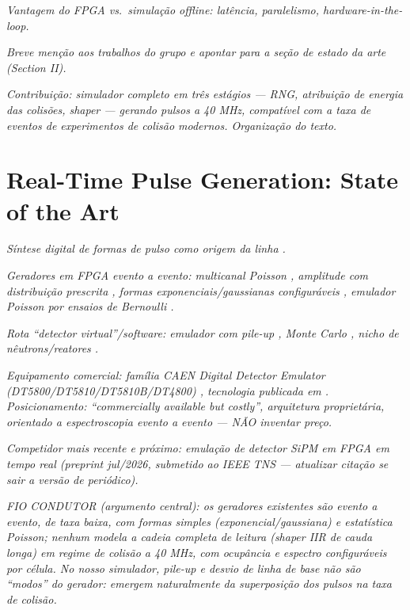\documentclass[journal]{IEEEtran}
\newcommand{\todo}[1]{\textcolor{red!70!black}{\textit{#1}}}
\begin{document}
\todo{Vantagem do FPGA vs.\ simulação offline: latência, paralelismo, hardware-in-the-loop.}

\todo{Breve menção aos trabalhos do grupo \cite{quirino2025,paschoalin2026} e apontar para a seção de estado da arte (Section II).}

\todo{Contribuição: simulador completo em três estágios — RNG, atribuição de energia das colisões, shaper — gerando pulsos a 40 MHz, compatível com a taxa de eventos de experimentos de colisão modernos. Organização do texto.}

\section{Real-Time Pulse Generation: State of the Art}

\todo{Síntese digital de formas de pulso como origem da linha \cite{jordanov1994,regadio2014}.}

\todo{Geradores em FPGA evento a evento: multicanal Poisson \cite{arkani2013}, amplitude com distribuição prescrita \cite{ponikvar2018}, formas exponenciais/gaussianas configuráveis \cite{garciaduran2019}, emulador Poisson por ensaios de Bernoulli \cite{ieee_neutron_emulator}.}

\todo{Rota ``detector virtual''/software: emulador com pile-up \cite{pechousek2016}, Monte Carlo \cite{lisangang2021,ma2024}, nicho de nêutrons/reatores \cite{wen2022}.}

\todo{Equipamento comercial: família CAEN Digital Detector Emulator (DT5800/DT5810/DT5810B/DT4800) \cite{caen_dt5810b}, tecnologia publicada em \cite{abba2014}. Posicionamento: ``commercially available but costly'', arquitetura proprietária, orientado a espectroscopia evento a evento — NÃO inventar preço.}

\todo{Competidor mais recente e próximo: emulação de detector SiPM em FPGA em tempo real \cite{carsi2026} (preprint jul/2026, submetido ao IEEE TNS — atualizar citação se sair a versão de periódico).}

\todo{FIO CONDUTOR (argumento central): os geradores existentes são evento a evento, de taxa baixa, com formas simples (exponencial/gaussiana) e estatística Poisson; nenhum modela a cadeia completa de leitura (shaper IIR de cauda longa) em regime de colisão a 40 MHz, com ocupância e espectro configuráveis por célula. No nosso simulador, pile-up e desvio de linha de base não são ``modos'' do gerador: emergem naturalmente da superposição dos pulsos na taxa de colisão.}
\end{document}
